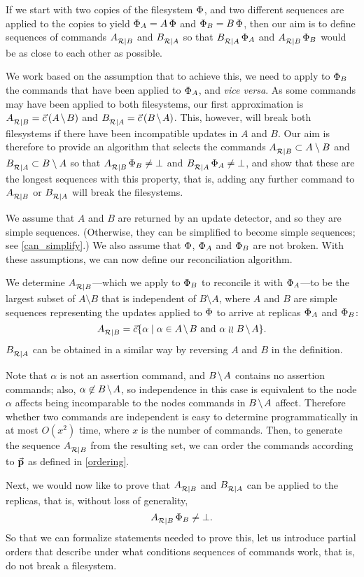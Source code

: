 
If we start with two copies of the filesystem $\Phi$,
and two different sequences are applied to the copies to yield $\Phi_A=A\,\Phi$
and $\Phi_B=B\,\Phi$, then our aim is to define sequences of commands ${A}^{}_{\mathcal{R}|{B}}$ and ${B}^{}_{\mathcal{R}|{A}}$
so that ${B}^{}_{\mathcal{R}|{A}}\,\Phi_A$ and ${A}^{}_{\mathcal{R}|{B}}\,\Phi_B$ would be as close to each other as possible.

We work based on the assumption that to achieve this, we need
to apply to $\Phi_B$ the commands that have been applied to $\Phi_A$, and \emph{vice versa}.
As some commands may have been applied to both filesystems, our first approximation
is $\reca = \amb$ and $\recb = \bma$.
This, however, will break both filesystems if there have been incompatible updates
in $A$ and $B$. 
Our aim is therefore to provide an algorithm that selects the commands 
${A}^{}_{\mathcal{R}|{B}} \subset A\setminus B$
and ${B}^{}_{\mathcal{R}|{A}} \subset B\setminus A$ 
so that ${A}^{}_{\mathcal{R}|{B}}\,\Phi_B\neq\bot$ and ${B}^{}_{\mathcal{R}|{A}}\,\Phi_A\neq\bot$,
and show that these are the longest sequences with this property, that is,
adding any further command to ${A}^{}_{\mathcal{R}|{B}}$ or ${B}^{}_{\mathcal{R}|{A}}$ will break the filesystems.

We assume that $A$ and $B$ are returned by an update detector,
and so they are simple sequences.
(Otherwise, they can be simplified to become simple sequences; see \cref{can_simplify}.)
We also assume that $\Phi$, $\Phi_A$ and $\Phi_B$ are not broken.
With these assumptions,
we can now define our reconciliation algorithm.

\begin{mydef}[Reconciliation]
We determine ${A}^{}_{\mathcal{R}|{B}}$---which we apply to $\Phi_B$ 
to reconcile it with $\Phi_A$---to be
the largest subset of $A\setminus B$
that is independent of $B\setminus A$,
where $A$ and $B$ are simple sequences representing
the updates applied to $\Phi$ to arrive at replicas $\Phi_A$ and $\Phi_B$:
\[ \reca = \ords{\alpha \whr \alpha\in \ambnp  \mbox{~and~}  \alpha\indep \bmanp }. \]
${B}^{}_{\mathcal{R}|{A}}$ can be obtained in a similar way by reversing $A$ and $B$
in the definition.
\end{mydef}

Note that $\alpha$ is not an assertion command, and $\bmanp$ contains no assertion commands;
also, $\alpha\not\in\bmanp$, so independence in this case is equivalent to
the node $\alpha$ affects being incomparable to the nodes commands in $\bmanp$ affect.
Therefore whether two commands are independent is easy to determine programmatically
in at most $O(x^2)$ time, where $x$ is the number of commands. %
Then, to generate the sequence ${A}^{}_{\mathcal{R}|{B}}$ from the resulting set, 
we can order the commands according to $\mathrel{\vec{\mathbf{p}}}$ as defined in \cref{ordering}.


\myskip
Next, we would now like to prove that ${A}^{}_{\mathcal{R}|{B}}$ and ${B}^{}_{\mathcal{R}|{A}}$ can be applied to the replicas,
that is, without loss of generality,
\[ {A}^{}_{\mathcal{R}|{B}}\,\Phi_B\neq\bot. \]
So that we can formalize statements needed to prove this,
let us introduce partial orders that describe under what conditions
sequences of commands work, that is, do not break a filesystem.
